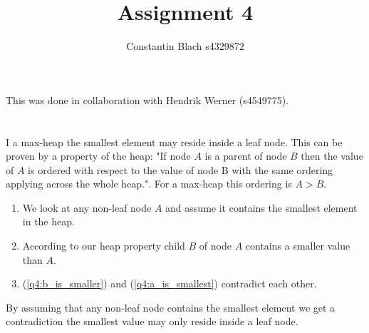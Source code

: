 \documentclass[12pt]{article}
\title {Assignment 4}
\author {Constantin Blach s4329872}
\begin{document}
\maketitle

This was done in collaboration with Hendrik Werner (s4549775).

\section{} %
\section{} %
\section{} %
\section{} %
I a max-heap the smallest element may reside inside a leaf node. This can be proven by a property of the heap: "If node $A$ is a parent of node $B$ then the value of $A$ is ordered with respect to the value of node B with the same ordering applying across the whole heap.". For a max-heap this ordering is $A > B$.

\begin{enumerate}
	\item \label{q4:a_is_smallest}
	We look at any non-leaf node $A$ and assume it contains the smallest element in the heap.
	\item \label{q4:b_is_smaller}
	According to our heap property child $B$ of node $A$ contains a smaller value than $A$.
	\item
	(\ref{q4:b_is_smaller}) and (\ref{q4:a_is_smallest}) contradict each other.
\end{enumerate}

By assuming that any non-leaf node contains the smallest element we get a contradiction the smallest value may only reside inside a leaf node.

\section{} %
\section{} %
\end{document}
